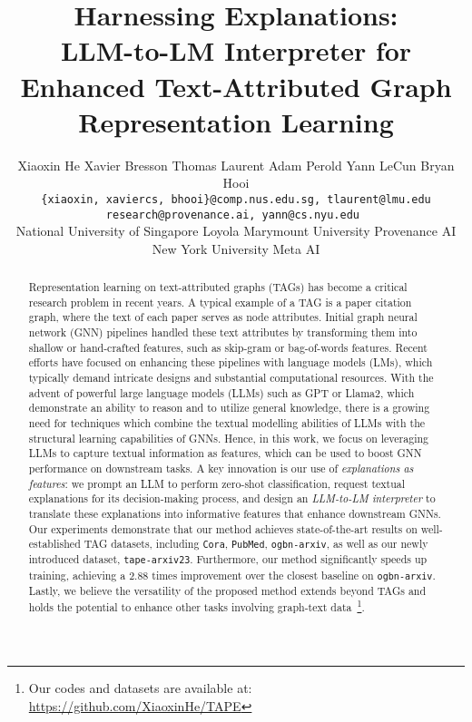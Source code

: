 \documentclass{article}
\title{Harnessing Explanations: \\LLM-to-LM Interpreter for Enhanced Text-Attributed Graph Representation Learning}
\author{\hspace{-0.4cm}
  Xiaoxin He 
  \hspace{0.05cm}
  Xavier Bresson
  \hspace{0.05cm}
  Thomas Laurent 
  \hspace{0.05cm}
  Adam Perold
  \hspace{0.05cm}
  Yann LeCun
  \hspace{0.05cm}
  Bryan Hooi
  \vspace{0.15cm} \\
  \texttt{\{xiaoxin, xaviercs, bhooi\}@comp.nus.edu.sg, tlaurent@lmu.edu}\\
  \texttt{research@provenance.ai, yann@cs.nyu.edu }
  \vspace{0.15cm} \\
  {\normalfont National University of Singapore \hspace{0.18cm} Loyola Marymount University \hspace{0.18cm} Provenance AI}\\
  New York University \hspace{0.18cm} Meta AI
}
\begin{document}
\maketitle




\begin{abstract}
Representation learning on text-attributed graphs (TAGs) has become a critical research problem in recent years. A typical example of a TAG is a paper citation graph, where the text of each paper serves as node attributes. Initial graph neural network (GNN) pipelines handled these text attributes by transforming them into shallow or hand-crafted features, such as skip-gram or bag-of-words features. Recent efforts have focused on enhancing these pipelines with language models (LMs), which typically demand intricate designs and substantial computational resources. With the advent of powerful large language models (LLMs) such as GPT or Llama2, which demonstrate an ability to reason and to utilize general knowledge, there is a growing need for techniques which combine the textual modelling abilities of LLMs with the structural learning capabilities of GNNs. Hence, in this work, we focus on leveraging LLMs to capture textual information as features, which can be used to boost GNN performance on downstream tasks. A key innovation is our use of \emph{explanations as features}: we prompt an LLM to perform zero-shot classification, request textual explanations for its decision-making process, and design an \emph{LLM-to-LM interpreter} to translate these explanations into informative features that enhance downstream GNNs. Our experiments demonstrate that our method achieves state-of-the-art results on well-established TAG datasets, including \texttt{Cora}, \texttt{PubMed}, \texttt{ogbn-arxiv}, as well as our newly introduced dataset, \texttt{tape-arxiv23}. Furthermore, our method significantly speeds up training, achieving a 2.88 times improvement over the closest baseline on \texttt{ogbn-arxiv}. Lastly, we believe the versatility of the proposed method extends beyond TAGs and holds the potential to enhance other tasks involving graph-text data~\footnote{Our codes and datasets are available at: \url{https://github.com/XiaoxinHe/TAPE}}.
\end{abstract}
\end{document}
